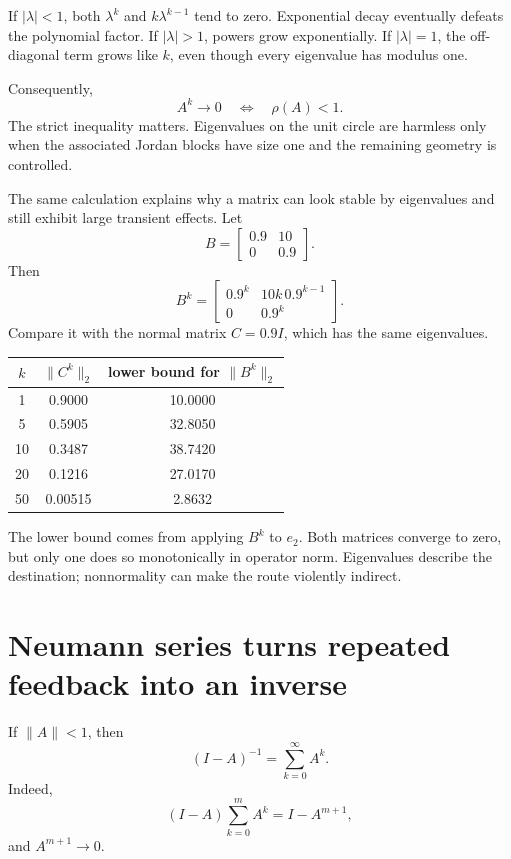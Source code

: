 If \(|\lambda|<1\), both \(\lambda^k\) and \(k\lambda^{k-1}\) tend to zero.  Exponential decay eventually defeats the polynomial factor.  If \(|\lambda|>1\), powers grow exponentially.  If \(|\lambda|=1\), the off-diagonal term grows like \(k\), even though every eigenvalue has modulus one.

Consequently,
\[
  A^k\to0
  \quad\Longleftrightarrow\quad
  \rho(A)<1.
\]
The strict inequality matters.  Eigenvalues on the unit circle are harmless only when the associated Jordan blocks have size one and the remaining geometry is controlled.

The same calculation explains why a matrix can look stable by eigenvalues and still exhibit large transient effects.  Let
\[
  B=
  \begin{bmatrix}
    0.9&10\\
    0&0.9
  \end{bmatrix}.
\]
Then
\[
  B^k=
  \begin{bmatrix}
    0.9^k&10k\,0.9^{k-1}\\
    0&0.9^k
  \end{bmatrix}.
\]
Compare it with the normal matrix \(C=0.9I\), which has the same eigenvalues.

\begin{center}
\small
\begin{tabular}{@{}c|cc@{}}
\toprule
\(k\) & \(\|C^k\|_2\) & lower bound for \(\|B^k\|_2\)\\
\midrule
1 & 0.9000 & 10.0000\\
5 & 0.5905 & 32.8050\\
10 & 0.3487 & 38.7420\\
20 & 0.1216 & 27.0170\\
50 & 0.00515 & 2.8632\\
\bottomrule
\end{tabular}
\end{center}

The lower bound comes from applying \(B^k\) to \(e_2\).  Both matrices converge to zero, but only one does so monotonically in operator norm.  Eigenvalues describe the destination; nonnormality can make the route violently indirect.

\section{Neumann series turns repeated feedback into an inverse}

If \(\|A\|<1\), then
\[
  (I-A)^{-1}
  =\sum_{k=0}^\infty A^k.
\]
Indeed,
\[
  (I-A)\sum_{k=0}^m A^k=I-A^{m+1},
\]
and \(A^{m+1}\to0\).

